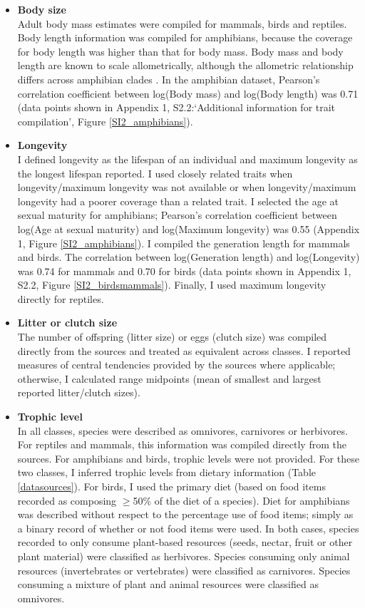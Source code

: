 \begin{itemize}
\item \textbf{Body size}\\
Adult body mass estimates were compiled for mammals, birds and reptiles. Body length information was compiled for amphibians, because the coverage for body length was higher than that for body mass. Body mass and body length are known to scale allometrically, although the allometric relationship differs across amphibian clades \citep{Santini2018}. In the amphibian dataset, Pearson’s correlation coefficient between log(Body mass) and log(Body length) was 0.71 (data points shown in Appendix 1, S2.2:`Additional information for trait compilation', Figure \ref{SI2_amphibians}).
 
\item \textbf{Longevity}\\
I defined longevity as the lifespan of an individual and maximum longevity as the longest lifespan reported. I used closely related traits when longevity/maximum longevity was not available or when longevity/maximum longevity had a poorer coverage than a related trait. I selected the age at sexual maturity for amphibians; Pearson’s correlation coefficient between log(Age at sexual maturity) and log(Maximum longevity) was 0.55 (Appendix 1, Figure \ref{SI2_amphibians}). I compiled the generation length for mammals and birds. The correlation between log(Generation length) and log(Longevity) was 0.74 for mammals and 0.70 for birds (data points shown in Appendix 1, S2.2, Figure \ref{SI2_birdsmammals}). Finally, I used maximum longevity directly for reptiles.

\item \textbf{Litter or clutch size}\\
The number of offspring (litter size) or eggs (clutch size) was compiled directly from the sources and treated as equivalent across classes. I reported measures of central tendencies provided by the sources where applicable; otherwise, I calculated range midpoints (mean of smallest and largest reported litter/clutch sizes).

\item \textbf{Trophic level}\\
In all classes, species were described as omnivores, carnivores or herbivores. For reptiles and mammals, this information was compiled directly from the sources. For amphibians and birds, trophic levels were not provided. For these two classes, I inferred trophic levels from dietary information (Table \ref{datasources}). For birds, I used the primary diet (based on food items recorded as composing $\geq$50\% of the diet of a species). Diet for amphibians was described without respect to the percentage use of food items; simply as a binary record of whether or not food items were used. In both cases, species recorded to only consume plant-based resources (seeds, nectar, fruit or other plant material) were classified as herbivores. Species consuming only animal resources (invertebrates or vertebrates) were classified as carnivores. Species consuming a mixture of plant and animal resources were classified as omnivores.


\end{itemize}
